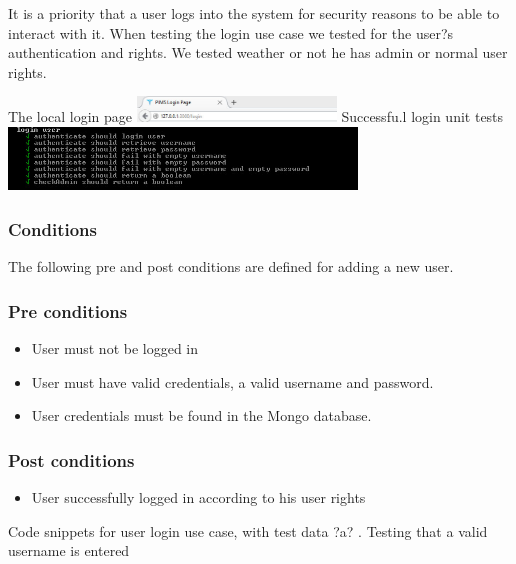 
It is a priority that a user logs into the system for security reasons to be able to interact with it. When testing the login use case we tested for the user?s authentication and rights. We tested weather or not he has admin or normal user rights.

The local login page
\newline 
\newline 
\includegraphics[width=200px]{./TestingDoc/Graphics/login}
\newline 
\newline 
Successfu.l login unit tests
\newline 
\newline 
\includegraphics[width=350px]{./TestingDoc/Graphics/LoginTests}	
\subsubsection*{Conditions}
The following pre and post conditions are defined for adding a new user.
	
\subsubsection*{Pre conditions}	
\begin{itemize}
		\item User must not be logged in
		\item User must have valid credentials, a valid username and password.
		\item User credentials must be found in the Mongo database.
\end{itemize}	

\subsubsection*{Post conditions}	
\begin{itemize}
		\item User successfully logged in according to his user rights
\end{itemize}	

Code snippets for user login use case, with test data ?a? . Testing that a valid username is entered	

